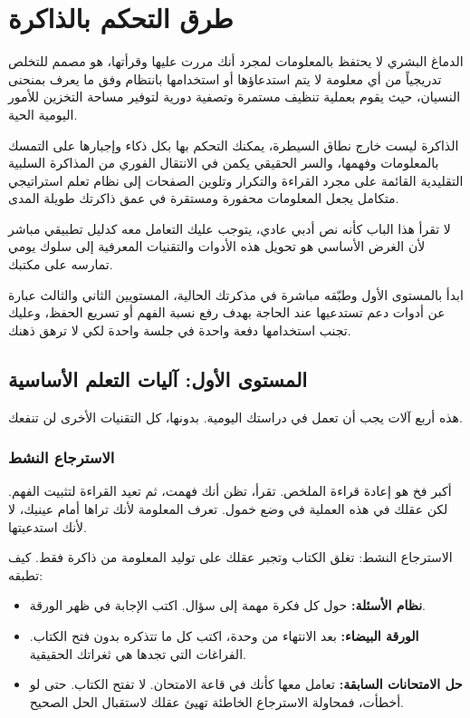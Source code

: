 \documentclass[12pt,a4paper]{book}
\begin{document}
	\chapter{طرق التحكم بالذاكرة}
	\label{chap:memory-mastery}
	
	الدماغ البشري لا يحتفظ بالمعلومات لمجرد أنك مررت عليها وقرأتها، هو مصمم للتخلص تدريجياً من أي معلومة لا يتم استدعاؤها أو استخدامها بانتظام وفق ما يعرف بمنحنى النسيان، حيث يقوم بعملية تنظيف مستمرة وتصفية دورية لتوفير مساحة التخزين للأمور اليومية الحية.
	
	الذاكرة ليست خارج نطاق السيطرة، يمكنك التحكم بها بكل ذكاء وإجبارها على التمسك بالمعلومات وفهمها، والسر الحقيقي يكمن في الانتقال الفوري من المذاكرة السلبية التقليدية القائمة على مجرد القراءة والتكرار وتلوين الصفحات إلى نظام تعلم استراتيجي متكامل يجعل المعلومات محفورة ومستقرة في عمق ذاكرتك طويلة المدى. 
	
	لا تقرأ هذا الباب كأنه نص أدبي عادي، يتوجب عليك التعامل معه كدليل تطبيقي مباشر لأن الغرض الأساسي هو تحويل هذه الأدوات والتقنيات المعرفية إلى سلوك يومي تمارسه على مكتبك.
	
	ابدأ بالمستوى الأول وطبّقه مباشرة في مذكرتك الحالية، المستويين الثاني والثالث عبارة عن أدوات دعم تستدعيها عند الحاجة بهدف رفع نسبة الفهم أو تسريع الحفظ، وعليك تجنب استخدامها دفعة واحدة في جلسة واحدة لكي لا ترهق ذهنك.
	

	\section{المستوى الأول: آليات التعلم الأساسية}
	هذه أربع آلات يجب أن تعمل في دراستك اليومية. بدونها، كل التقنيات الأخرى لن تنفعك.
	
	\subsection{الاسترجاع النشط}
	
	أكبر فخ هو إعادة قراءة الملخص. تقرأ، تظن أنك فهمت، ثم تعيد القراءة لتثبيت الفهم. لكن عقلك في هذه العملية في وضع خمول. تعرف المعلومة لأنك تراها أمام عينيك، لا لأنك استدعيتها.
	
	الاسترجاع النشط: تغلق الكتاب وتجبر عقلك على توليد المعلومة من ذاكرة فقط. كيف تطبقه:
	\begin{itemize}
		\item \textbf{نظام الأسئلة:} حول كل فكرة مهمة إلى سؤال. اكتب الإجابة في ظهر الورقة.
		\item \textbf{الورقة البيضاء:} بعد الانتهاء من وحدة، اكتب كل ما تتذكره بدون فتح الكتاب. الفراغات التي تجدها هي ثغراتك الحقيقية.
		\item \textbf{حل الامتحانات السابقة:} تعامل معها كأنك في قاعة الامتحان. لا تفتح الكتاب. حتى لو أخطأت، فمحاولة الاسترجاع الخاطئة تهيئ عقلك لاستقبال الحل الصحيح.
	\end{itemize}
	
\end{document}
